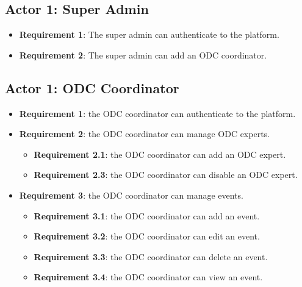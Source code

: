 \subsection{Actor 1: Super Admin}
\begin{itemize}
      \item \textbf{Requirement 1}: The super admin can authenticate to the
            platform.
      \item \textbf{Requirement 2}: The super admin can add an ODC coordinator.
\end{itemize}

\subsection{Actor 1: ODC Coordinator}
\begin{itemize}
      \item \textbf{Requirement 1}: the ODC coordinator can authenticate to the
            platform.
      \item \textbf{Requirement 2}: the ODC coordinator can manage ODC experts.
            \begin{itemize}
                  \item \textbf{Requirement 2.1}: the ODC coordinator can add an ODC
                        expert.
                  \item \textbf{Requirement 2.3}: the ODC coordinator can disable an
                        ODC expert.
            \end{itemize}
      \item \textbf{Requirement 3}: the ODC coordinator can manage events.
            \begin{itemize}
                  \item \textbf{Requirement 3.1}: the ODC coordinator can add an event.
                  \item \textbf{Requirement 3.2}: the ODC coordinator can edit an
                        event.
                  \item \textbf{Requirement 3.3}: the ODC coordinator can delete an
                        event.
                  \item \textbf{Requirement 3.4}: the ODC coordinator can view an
                        event.
            \end{itemize}
\end{itemize}

